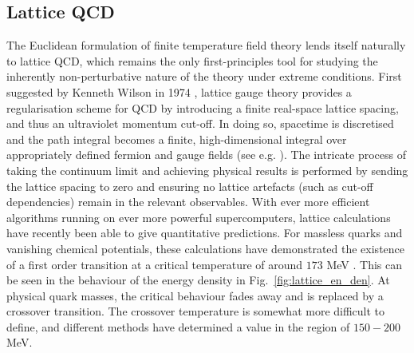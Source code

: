 \documentclass[11pt, a4paper, twoside]{book}
\begin{document}
\subsection{Lattice QCD}
\label{sec:latticeQCD}
The Euclidean formulation of finite temperature field theory lends itself naturally to lattice QCD, which remains the only first-principles tool for studying the inherently non-perturbative nature of the theory under extreme conditions. First suggested by Kenneth Wilson in 1974 \cite{Wilson:1974sk}, lattice gauge theory provides a regularisation scheme for QCD by introducing a finite real-space lattice spacing, and thus an ultraviolet momentum cut-off. In doing so, spacetime is discretised and the path integral becomes a finite, high-dimensional integral over appropriately defined fermion and gauge fields (see e.g. \cite{Rothe:1992nt}). The intricate process of taking the continuum limit and achieving physical results is performed by sending the lattice spacing to zero and ensuring no lattice artefacts (such as cut-off dependencies) remain in the relevant observables. With ever more efficient algorithms running on ever more powerful supercomputers, lattice calculations have recently been able to give quantitative predictions. For massless quarks and vanishing chemical potentials, these calculations have demonstrated the existence of a first order transition at a critical temperature of around \(173\) MeV \cite{Martinez:2013xka}. This can be seen in the behaviour of the energy density in Fig.~\ref{fig:lattice_en_den}. At physical quark masses, the critical behaviour fades away and is replaced by a crossover transition. The crossover temperature is somewhat more difficult to define, and different methods have determined a value in the region of \(150-200\) MeV. 
\end{document}
